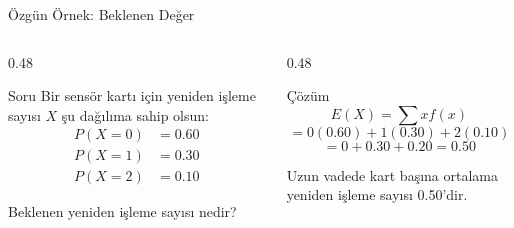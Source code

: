 \documentclass[light]{lutbeamer}
\begin{document}
\begin{frame}{Özgün Örnek: Beklenen Değer}
\small
\begin{columns}[T,onlytextwidth]
    \begin{column}{0.48\textwidth}
        \begin{block}{Soru}
            Bir sensör kartı için yeniden işleme sayısı $X$ şu dağılıma sahip olsun:
            \[
            \begin{aligned}
            P(X=0)&=0.60 \\
            P(X=1)&=0.30 \\
            P(X=2)&=0.10
            \end{aligned}
            \]

            \vspace{0.15cm}
            Beklenen yeniden işleme sayısı nedir?
        \end{block}
    \end{column}
    \begin{column}{0.48\textwidth}
        \begin{exampleblock}{Çözüm}
            \[
            E(X)=\sum x f(x)
            \]
            \[
            =0(0.60)+1(0.30)+2(0.10)
            \]
            \[
            =0+0.30+0.20=0.50
            \]

            Uzun vadede kart başına ortalama yeniden işleme sayısı 0.50'dir.
        \end{exampleblock}
    \end{column}
\end{columns}
\end{frame}
\end{document}
